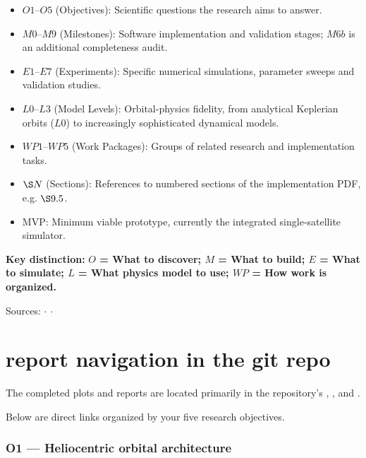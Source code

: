 \documentclass{article}
\begin{document}
\begin{itemize}
\item \(O1\)--\(O5\) (Objectives): Scientific questions the research aims to answer.
\item \(M0\)--\(M9\) (Milestones): Software implementation and validation stages; \(M6b\) is an additional completeness audit.
\item \(E1\)--\(E7\) (Experiments): Specific numerical simulations, parameter sweeps and validation studies.
\item \(L0\)--\(L3\) (Model Levels): Orbital-physics fidelity, from analytical Keplerian orbits (\(L0\)) to increasingly sophisticated dynamical models.
\item \(WP1\)--\(WP5\) (Work Packages): Groups of related research and implementation tasks.
\item \(\S N\) (Sections): References to numbered sections of the implementation PDF, e.g. \(\S 9.5\).
\item MVP: Minimum viable prototype, currently the integrated single-satellite simulator.
\end{itemize}

\textbf{Key distinction:} \textbf{\(O\) = What to discover; \(M\) = What to build; \(E\) = What to simulate; \(L\) = What physics model to use; \(WP\) = How work is organized.}

Sources: \href{https://github.com/extremefattypunch/Project-Dyson-Sphere/tree/helioswarm-m0-m6}{\textbullet} \(\cdot\) \href{https://github.com/extremefattypunch/Project-Dyson-Sphere/blob/helioswarm-m0-m6/experiments/README.md}{\textbullet} \(\cdot\) \href{https://github.com/extremefattypunch/Project-Dyson-Sphere/blob/helioswarm-m0-m6/docs/model_assumptions.md}{\textbullet}
\section{report navigation in the git repo}
The completed plots and reports are located primarily in the repository's \href{https://github.com/extremefattypunch/Project-Dyson-Sphere/tree/helioswarm-m0-m6/figures}{\textbullet}, \href{https://github.com/extremefattypunch/Project-Dyson-Sphere/tree/helioswarm-m0-m6/docs/milestones/}{\textbullet}, and \href{https://github.com/extremefattypunch/Project-Dyson-Sphere/blob/helioswarm-m0-m6/docs/validation_report.md}{\textbullet}.

Below are direct links organized by your five research objectives.

\subsubsection*{O1 --- Heliocentric orbital architecture}
\end{document}
